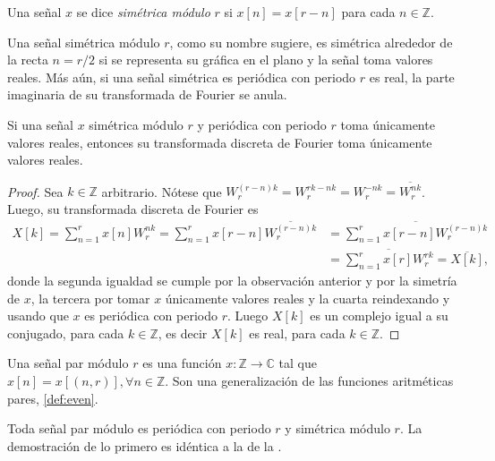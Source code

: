 \begin{definition}
Una señal $x$ se dice \emph{simétrica módulo} $r$ si $x[n] = x[r-n]$ para cada $n \in \mathbb{Z}$.
\end{definition}

Una señal simétrica módulo $r$, como su nombre sugiere, es simétrica alrededor de la recta $n = r/2$ si se representa su gráfica en el plano y la señal toma valores reales. Más aún, si una señal simétrica es periódica con periodo $r$ es real, la parte imaginaria de su transformada de Fourier se anula.

\begin{proposition}\label{prop:real}
Si una señal $x$ simétrica módulo $r$ y periódica con periodo $r$ toma únicamente valores reales, entonces su transformada discreta de Fourier toma únicamente valores reales.
\end{proposition}

\begin{proof}
Sea $k \in \mathbb{Z}$ arbitrario. Nótese que $W_r^{(r-n)k} = W_r^{rk-nk} = W_r^{-n k} = \overline{W_r^{nk}}$. Luego, su transformada discreta de Fourier es
\begin{align*}
    X[k] = \sum_{n=1}^{r} x[n] W_r^{n k} = \sum_{n=1}^{r} x[r-n] \overline{W_r^{(r-n) k}} & = \overline{\sum_{n=1}^{r} x[r-n] W_r^{(r-n) k}} \\
                                                                                          & = \overline{\sum_{n=1}^{r} x[r] W_r^{r k}} = \overline{X[k]},
\end{align*}
donde la segunda igualdad se cumple por la observación anterior y por la simetría de $x$, la tercera por tomar $x$ únicamente valores reales y la cuarta reindexando y usando que $x$ es periódica con periodo $r$. Luego $X[k]$ es un complejo igual a su conjugado, para cada $k \in \mathbb{Z}$, es decir $X[k]$ es real, para cada $k \in \mathbb{Z}$.
\end{proof}

\begin{definition}
Una señal par módulo $r$ es una función $x : \mathbb{Z} \longrightarrow \mathbb{C}$ tal que $x[n] = x[(n,r)], \forall n \in \mathbb{Z}$. Son una generalización de las funciones aritméticas pares, \cref{def:even}.
\end{definition}

Toda señal par módulo es periódica con periodo $r$ y simétrica módulo $r$. La demostración de lo primero es idéntica a la de la .

